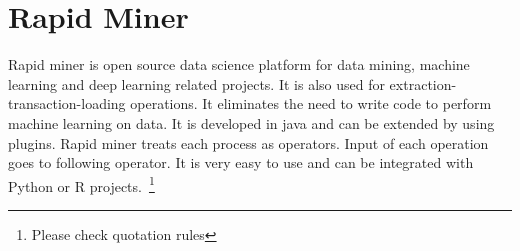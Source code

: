 \section{Rapid Miner}

Rapid miner is open source data science platform for data mining, machine
learning and deep learning related projects. It is also used for
extraction-transaction-loading operations. It eliminates the need to write code
to perform machine learning on data. It is developed in java and can be extended
 by using plugins.
Rapid miner treats each process as operators. Input of each operation goes to
following operator. It is very easy to use and can be integrated with Python or
R projects.~\cite{hid-sp18-502-RapidMiner}\footnote{Please check quotation rules}



